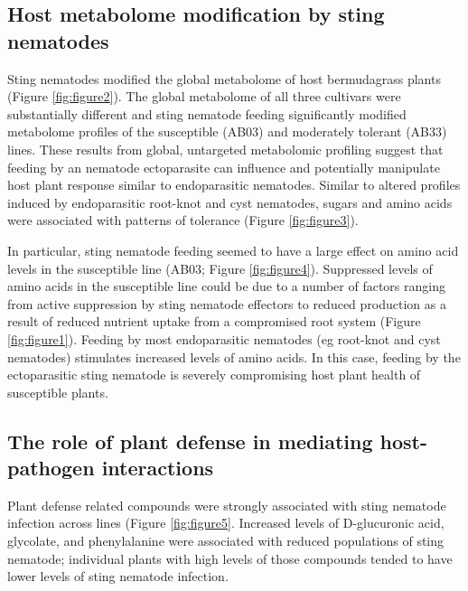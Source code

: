 \documentclass[fleqn,10pt]{wlscirep}
\begin{document}
\subsection*{Host metabolome modification by sting nematodes}
Sting nematodes modified the global metabolome of host bermudagrass plants (Figure \ref{fig:figure2}).  The global metabolome of all three cultivars were substantially different and sting nematode feeding significantly modified metabolome profiles of the susceptible (AB03) and moderately tolerant (AB33) lines.  These results from global, untargeted metabolomic profiling suggest that feeding by an nematode ectoparasite can influence and potentially manipulate host plant response similar to endoparasitic nematodes.  Similar to altered profiles induced by endoparasitic root-knot and cyst nematodes, sugars and amino acids were associated with patterns of tolerance (Figure \ref{fig:figure3}).  

In particular, sting nematode feeding seemed to have a large effect on amino acid levels in the susceptible line (AB03; Figure \ref{fig:figure4}). Suppressed levels of amino acids in the susceptible line could be due to a number of factors ranging from active suppression by sting nematode effectors to reduced production as a result of reduced nutrient uptake from a compromised root system (Figure \ref{fig:figure1}). Feeding by most endoparasitic nematodes (eg root-knot and cyst nematodes) stimulates increased levels of amino acids. In this case, feeding by the ectoparasitic sting nematode is severely compromising host plant health of susceptible plants. 

\subsection*{The role of plant defense in mediating host-pathogen interactions}
Plant defense related compounds were strongly associated with sting nematode infection across lines (Figure \ref{fig:figure5}.  Increased levels of D-glucuronic acid, glycolate, and phenylalanine were associated with reduced populations of sting nematode; individual plants with high levels of those compounds tended to have lower levels of sting nematode infection.  
\end{document}
